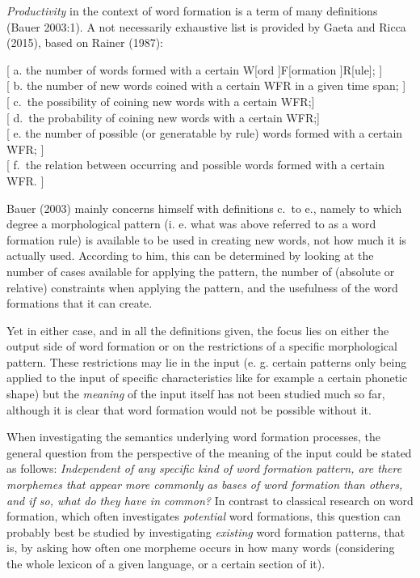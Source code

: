 \documentclass[
  english,
  a4paper,
  oneside,tablecaptionabove
]{scrbook}
\begin{document}
\emph{Productivity} in the context of word formation is a term of many
definitions (Bauer 2003:1). A not necessarily exhaustive list is
provided by Gaeta and Ricca (2015), based on Rainer (1987):

{[} a. the number of words formed with a certain W{[}ord {]}F{[}ormation
{]}R{[}ule{]}; {]}\\
{[} b. the number of new words coined with a certain WFR in a given time
span; {]}\\
{[} c.~the possibility of coining new words with a certain WFR;{]}\\
{[} d.~the probability of coining new words with a certain WFR;{]}\\
{[} e. the number of possible (or generatable by rule) words formed with
a certain WFR; {]}\\
{[} f.~the relation between occurring and possible words formed with a
certain WFR. {]}

Bauer (2003) mainly concerns himself with definitions c.~to e., namely
to which degree a morphological pattern (i. e. what was above referred
to as a word formation rule) is available to be used in creating new
words, not how much it is actually used. According to him, this can be
determined by looking at the number of cases available for applying the
pattern, the number of (absolute or relative) constraints when applying
the pattern, and the usefulness of the word formations that it can
create.

Yet in either case, and in all the definitions given, the focus lies on
either the output side of word formation or on the restrictions of a
specific morphological pattern. These restrictions may lie in the input
(e. g. certain patterns only being applied to the input of specific
characteristics like for example a certain phonetic shape) but the
\emph{meaning} of the input itself has not been studied much so far,
although it is clear that word formation would not be possible without
it.

When investigating the semantics underlying word formation processes,
the general question from the perspective of the meaning of the input
could be stated as follows: \emph{Independent of any specific kind of
word formation pattern, are there morphemes that appear more commonly}
\emph{as bases of word formation than others, and if so, what do they
have in common?} In contrast to classical research on word formation,
which often investigates \emph{potential} word formations, this question
can probably best be studied by investigating \emph{existing} word
formation patterns, that is, by asking how often one morpheme occurs in
how many words (considering the whole lexicon of a given language, or a
certain section of it).
\end{document}
